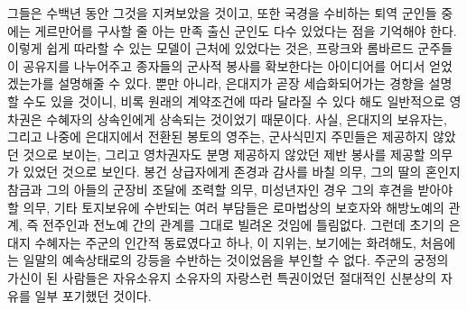 그들은 수백년 동안 그것을 지켜보았을 것이고,
또한 국경을 수비하는 퇴역 군인들 중에는
게르만어를 구사할 줄 아는 만족 출신 군인도 다수 있었다는 점을
기억해야 한다.
이렇게 쉽게 따라할 수 있는 모델이 근처에 있었다는 것은,
프랑크와 롬바르드 군주들이
공유지를 나누어주고 종자들의 군사적 봉사를 확보한다는
아이디어를 어디서 얻었겠는가를
설명해줄 수 있다.
뿐만 아니라,
은대지가
곧장 세습화되어가는
경향을
설명할 수도 있을 것이니,
비록 원래의 계약조건에 따라 달라질 수 있다 해도
일반적으로 영차권은 수혜자의 상속인에게 상속되는 것이었기 때문이다.
사실,
은대지의 보유자는,
그리고 나중에 은대지에서 전환된 봉토의 영주는,
군사식민지 주민들은 제공하지 않았던 것으로 보이는,
그리고 영차권자도 분명 제공하지 않았던
제반 봉사를
제공할 의무가 있었던 것으로 보인다.
봉건 상급자에게 존경과 감사를 바칠 의무,
그의 딸의 혼인지참금과 그의 아들의 군장비 조달에 조력할 의무,
미성년자인 경우 그의 후견을 받아야할 의무,
기타 토지보유에 수반되는 여러 부담들은
로마법상의 보호자와 해방노예의 관계,
즉 전주인과 전노예 간의 관계를
그대로 빌려온 것임에 틀림없다.
그런데 초기의 은대지 수혜자는
주군의 인간적 동료였다고 하나,
이 지위는,
보기에는 화려해도,
처음에는 일말의 예속상태로의 강등을 수반하는 것이었음을
부인할 수 없다.
주군의 궁정의 가신이 된 사람들은
자유소유지 소유자의 자랑스런 특권이었던
절대적인 신분상의 자유를 일부 포기했던 것이다.

